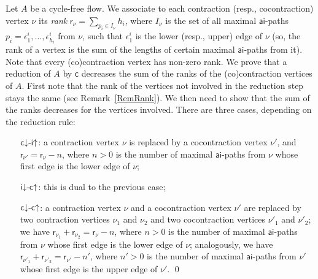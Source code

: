 \documentclass[a4paper]{LMCS}
\begin{document}
\proof
Let $A$ be a cycle-free flow. We associate to each contraction (resp., cocontraction) vertex $\nu$ its \emph{rank} ${{\mathsf r}}_\nu=\sum_{p_i\in I_\nu}h_i$, where $I_\nu$ is the set of all maximal ${\mathsf{ai}}$-paths $p_i=\epsilon^i_1,\dots,\epsilon^i_{h_i}$ from $\nu$, such that $\epsilon^i_1$ is the lower (resp., upper) edge of $\nu$ (so, the rank of a vertex is the sum of the lengths of certain maximal ${\mathsf{ai}}$-paths from it). Note that every (co)contraction vertex has non-zero rank. We prove that a reduction of $A$ by ${{\mathsf c}}$ decreases the sum of the ranks of the (co)contraction vertices of $A$. First note that the rank of the vertices not involved in the reduction step stays the same (see Remark~\ref{RemRank}). We then need to show that the sum of the ranks decreases for the vertices involved. There are three cases, depending on the reduction rule:
\begin{itemize}
\item[${{{\mathsf c}{\downarrow}{\hbox{-}}{\mathsf i}{\uparrow  }}}$:]a contraction vertex $\nu$ is replaced by a cocontraction vertex $\nu'$, and ${{\mathsf r}}_{\nu'}={{\mathsf r}}_\nu-n$, where $n>0$ is the number of maximal ${\mathsf{ai}}$-paths from $\nu$ whose first edge is the lower edge of $\nu$;
\item[${{{\mathsf i}{\downarrow}{\hbox{-}}{\mathsf c}{\uparrow  }}}$:]this is dual to the previous case;
\item[${{{\mathsf c}{\downarrow}{\hbox{-}}{\mathsf c}{\uparrow  }}}$:]a contraction vertex $\nu$ and a cocontraction vertex $\nu'$ are replaced by two contraction vertices $\nu_1$ and $\nu_2$ and two cocontraction vertices $\nu'_1$ and $\nu'_2$; we have ${{\mathsf r}}_{\nu_1}+{{\mathsf r}}_{\nu_2}={{\mathsf r}}_\nu-n$, where $n>0$ is the number of maximal ${\mathsf{ai}}$-paths from $\nu$ whose first edge is the lower edge of $\nu$; analogously, we have ${{\mathsf r}}_{\nu'_1}+{{\mathsf r}}_{\nu'_2}={{\mathsf r}}_{\nu'}-n'$, where $n'>0$ is the number of maximal ${\mathsf{ai}}$-paths from $\nu'$ whose first edge is the upper edge of $\nu'$.
\qed
\end{itemize}
\end{document}
